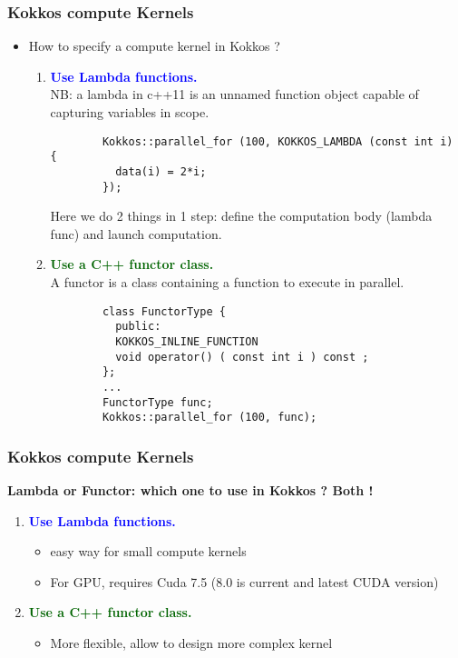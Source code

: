 \begin{frame}[fragile=singleslide]
  \frametitle{Kokkos compute Kernels}

  \begin{itemize}
  \item How to specify a compute kernel in Kokkos ?
    \begin{enumerate}
    \item \textcolor{blue}{\textbf{Use Lambda functions.}}\\
      NB: a lambda in c++11 is an unnamed function object capable of capturing variables in scope.
      \begin{verbatim}
        Kokkos::parallel_for (100, KOKKOS_LAMBDA (const int i) {
          data(i) = 2*i;
        });
      \end{verbatim}
      Here we do 2 things in 1 step: define the computation body (lambda func) and launch computation.
    \item \textcolor{darkgreen}{\textbf{Use a C++ functor class.}}\\
      A functor is a class containing a function to execute in parallel.
      \begin{verbatim}
        class FunctorType {
          public:
          KOKKOS_INLINE_FUNCTION
          void operator() ( const int i ) const ;
        };
        ...
        FunctorType func;
        Kokkos::parallel_for (100, func);
      \end{verbatim}
    \end{enumerate}
  \end{itemize}

\end{frame}


\begin{frame}[fragile=singleslide]
  \frametitle{Kokkos compute Kernels}

  \textbf{Lambda or Functor: which one to use in Kokkos ? Both !}
  \begin{enumerate}
  \item \textcolor{blue}{\textbf{Use Lambda functions.}}\\
    \begin{itemize}
    \item easy way for small compute kernels
    \item For GPU, requires Cuda 7.5 (8.0 is current and latest CUDA version)
    \end{itemize}
  \item \textcolor{darkgreen}{\textbf{Use a C++ functor class.}}\\
    \begin{itemize}
    \item More flexible, allow to design more complex kernel
    \end{itemize}
  \end{enumerate}
\end{frame}
